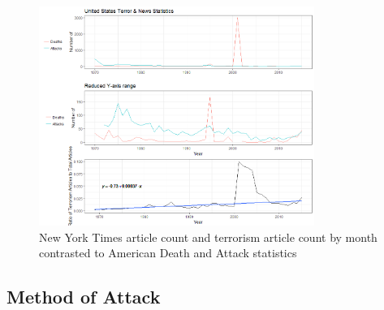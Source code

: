\documentclass[10pt,a4paper]{article}
\begin{document}
\begin{center}
\begin{figure}[h!]
		
	\includegraphics[width=0.8\textwidth]{Plots/NewsData/AttackNewsData.png}
	\caption{New York Times article count and terrorism article count by month contrasted to American Death and Attack statistics}
	
\end{figure}
\end{center}
	
\pagebreak
\subsection{Method of Attack}
\end{document}
